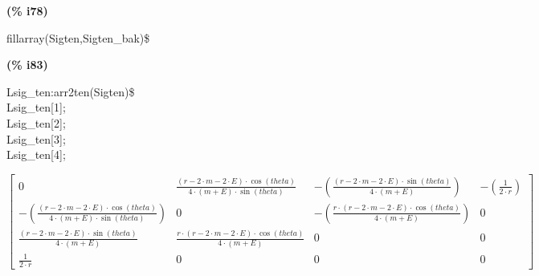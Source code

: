 \documentclass[fleqn]{article}
\begin{document}
\noindent
\begin{minipage}[t]{4.000000em}\color{red}\bfseries
(\% i78)	
\end{minipage}
\begin{minipage}[t]{\textwidth}\color{blue}
fillarray(Sigten,Sigten\_bak)\$
\end{minipage}

\noindent%



\noindent
\begin{minipage}[t]{4.000000em}\color{red}\bfseries
(\% i83)	
\end{minipage}
\begin{minipage}[t]{\textwidth}\color{blue}
Lsig\_ten:arr2ten(Sigten)\$\\
Lsig\_ten[1];\\
Lsig\_ten[2];\\
Lsig\_ten[3];\\
Lsig\_ten[4];
\end{minipage}
\[\displaystyle \tag{\% o80} 
\begin{bmatrix}0 & \frac{\left( r\mathop{-}2\mathop{\ensuremath{\cdot}}m\mathop{-}2\mathop{\ensuremath{\cdot}}E\right) \mathop{\ensuremath{\cdot}}\cos{(theta)}}{4\mathop{\ensuremath{\cdot}}\left( m\mathop{+}E\right) \mathop{\ensuremath{\cdot}}\sin{(theta)}} & \mathop{-}\left( \frac{\left( r\mathop{-}2\mathop{\ensuremath{\cdot}}m\mathop{-}2\mathop{\ensuremath{\cdot}}E\right) \mathop{\ensuremath{\cdot}}\sin{(theta)}}{4\mathop{\ensuremath{\cdot}}\left( m\mathop{+}E\right) }\right)  & \mathop{-}\left( \frac{1}{2\mathop{\ensuremath{\cdot}}r}\right) \\
\mathop{-}\left( \frac{\left( r\mathop{-}2\mathop{\ensuremath{\cdot}}m\mathop{-}2\mathop{\ensuremath{\cdot}}E\right) \mathop{\ensuremath{\cdot}}\cos{(theta)}}{4\mathop{\ensuremath{\cdot}}\left( m\mathop{+}E\right) \mathop{\ensuremath{\cdot}}\sin{(theta)}}\right)  & 0 & \mathop{-}\left( \frac{r\mathop{\ensuremath{\cdot}}\left( r\mathop{-}2\mathop{\ensuremath{\cdot}}m\mathop{-}2\mathop{\ensuremath{\cdot}}E\right) \mathop{\ensuremath{\cdot}}\cos{(theta)}}{4\mathop{\ensuremath{\cdot}}\left( m\mathop{+}E\right) }\right)  & 0\\
\frac{\left( r\mathop{-}2\mathop{\ensuremath{\cdot}}m\mathop{-}2\mathop{\ensuremath{\cdot}}E\right) \mathop{\ensuremath{\cdot}}\sin{(theta)}}{4\mathop{\ensuremath{\cdot}}\left( m\mathop{+}E\right) } & \frac{r\mathop{\ensuremath{\cdot}}\left( r\mathop{-}2\mathop{\ensuremath{\cdot}}m\mathop{-}2\mathop{\ensuremath{\cdot}}E\right) \mathop{\ensuremath{\cdot}}\cos{(theta)}}{4\mathop{\ensuremath{\cdot}}\left( m\mathop{+}E\right) } & 0 & 0\\
\frac{1}{2\mathop{\ensuremath{\cdot}}r} & 0 & 0 & 0\end{bmatrix}\mbox{}\]
\end{document}

